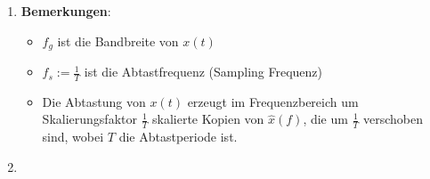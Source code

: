 \documentclass[11pt]{article}
\begin{document}
\begin{enumerate}
\begin{center}
    \end{center}
    \vspace*{-0.5cm}
    \item[] \textbf{Bemerkungen}: \begin{itemize}
        \item $f_g$ ist die Bandbreite von $x(t)$
        \item $f_s := \displaystyle\frac{1}{T}$ ist die Abtastfrequenz (Sampling Frequenz)
        \item Die Abtastung von $x(t)$ erzeugt im Frequenzbereich um Skalierungsfaktor $\frac{1}{T}$ skalierte Kopien von $\hat{x}(f)$, die um $\frac{1}{T}$ verschoben sind, wobei $T$ die Abtastperiode ist.
    \end{itemize}
    \item[] %
\end{enumerate}

\pagebreak
\end{document}
